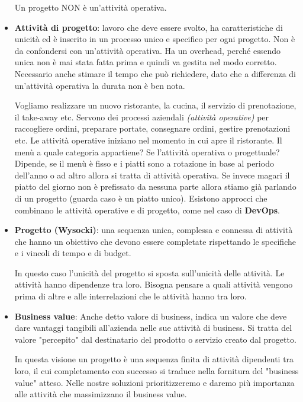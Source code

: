 \begin{itemize}
	\begin{warn}
		Un progetto NON è un'attività operativa.
	\end{warn}
	\item\textbf{Attività di progetto}: lavoro che deve essere svolto, ha caratteristiche di unicità ed è inserito in un processo unico e specifico per ogni progetto. Non è da confondersi con un'attività operativa. Ha un overhead, perché essendo unica non è mai stata fatta prima e quindi va gestita nel modo corretto. Necessario anche stimare il tempo che può richiedere, dato che a differenza di un'attività operativa la durata non è ben nota. 
	\begin{info}
		Vogliamo realizzare un nuovo ristorante, la cucina, il servizio di prenotazione, il take-away etc.\newline
		Servono dei processi aziendali \textit{(attività operative)} per raccogliere ordini, preparare portate, consegnare ordini, gestire prenotazioni etc.\newline
		Le attività operative iniziano nel momento in cui apre il ristorante.\newline
		Il menù a quale categoria appartiene? Se l'attività operativa o progettuale? Dipende, se il menù è fisso e i piatti sono a rotazione in base al periodo dell'anno o ad altro allora si tratta di attività operativa. Se invece magari il piatto del giorno non è prefissato da nessuna parte allora stiamo già parlando di un progetto (guarda caso è un piatto unico).\newline
		Esistono approcci che combinano le attività operative e di progetto, come nel caso di \textbf{DevOps}.
	\end{info}
	\item \textbf{Progetto (Wysocki)}: una sequenza unica, complessa e connessa di attività che hanno un obiettivo che devono essere completate rispettando le specifiche e i vincoli di tempo e di budget.
	\begin{info}
		In questo caso l'unicità del progetto si sposta sull'unicità delle attività. Le attività hanno dipendenze tra loro. Bisogna pensare a quali attività vengono prima di altre e alle interrelazioni che le attività hanno tra loro. 
	\end{info}
	\item \textbf{Business value}: Anche detto valore di business, indica un valore che deve dare vantaggi tangibili all'azienda nelle sue attività di business. Si tratta del valore "percepito" dal destinatario del prodotto o servizio creato dal progetto.
	\begin{info}
		In questa visione un progetto è una sequenza finita di attività dipendenti tra loro, il cui completamento con successo si traduce nella fornitura del "business value" atteso. Nelle nostre soluzioni prioritizzeremo e daremo più importanza alle attività che massimizzano il business value.
	\end{info}
\end{itemize}
